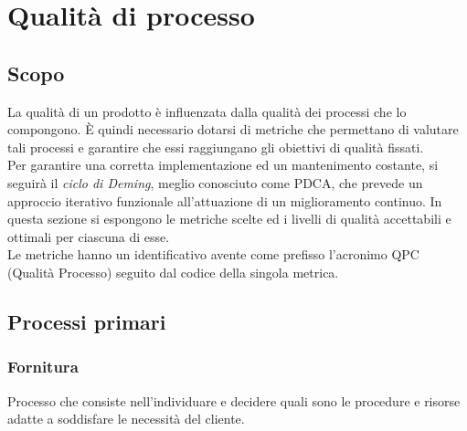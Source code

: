 

\section{Qualità di processo}
\subsection{Scopo}
La qualità di un prodotto è influenzata dalla qualità dei processi che lo compongono.
È quindi necessario dotarsi di metriche che permettano di valutare tali processi e garantire che essi
raggiungano gli obiettivi di qualità fissati.\\
Per garantire una corretta implementazione ed un mantenimento costante, si seguirà
il \textit{ciclo di Deming}, meglio conosciuto come PDCA, che prevede un approccio iterativo funzionale
all'attuazione di un miglioramento continuo.
In questa sezione si espongono le metriche scelte ed i livelli di qualità accettabili e ottimali per ciascuna
di esse.\\
Le metriche hanno un identificativo avente come prefisso l'acronimo QPC (Qualità Processo) seguito dal codice della singola metrica.\\

\subsection{Processi primari}

\subsubsection{Fornitura}
Processo che consiste nell'individuare e decidere quali sono le procedure e risorse adatte a soddisfare le necessità del cliente.\\
